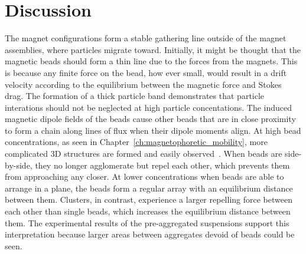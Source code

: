 
\section{Discussion}
The magnet configurations form a stable gathering line outside of the magnet assemblies, where particles migrate toward. Initially, it might be thought that the magnetic beads should form a thin line due to the forces from the magnets. This is because any finite force on the bead, how ever small, would result in a drift velocity according to the equilibrium between the magnetic force and Stokes drag. The formation of a thick particle band demonstrates that particle interations should not be neglected at high particle concentations. The induced magnetic dipole fields of the beads cause other beads that are in close proximity to form a chain along lines of flux when their dipole moments align. At high bead concentrations, as seen in Chapter~\ref{ch:magnetophoretic_mobility}, more complicated 3D structures are formed and easily observed~\cite{Saliba2010,Wittbracht2011,Wittbracht2012}. When beads are side-by-side, they no longer agglomerate but repel each other, which prevents them from approaching any closer. At lower concentrations when beads are able to arrange in a plane, the beads form a regular array with an equilibrium distance between them. Clusters, in contrast, experience a larger repelling force between each other than single beads, which increases the equilibrium distance between them. The experimental results of the pre-aggregated suspensions support this interpretation because larger areas between aggregates devoid of beads could be seen.

